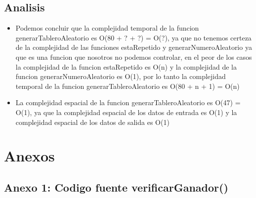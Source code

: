 \documentclass[10pt,twocolumn]{article}
\begin{document}
\subsection{Analisis}
\begin{itemize}
\item Podemos concluir que la complejidad temporal de la funcion generarTableroAleatorio es O(80 + ? + ?) = O(?), ya que no tenemos certeza de la complejidad de las funciones estaRepetido y generarNumeroAleatorio ya que es una funcion que nosotros no podemos controlar, en el peor de los casos la complejidad de la funcion estaRepetido es O(n) y la complejidad de la funcion generarNumeroAleatorio es O(1), por lo tanto la complejidad temporal de la funcion generarTableroAleatorio es O(80 + n + 1) = O(n)
\item La complejidad espacial de la funcion generarTableroAleatorio es O(47) = O(1), ya que la complejidad espacial de los datos de entrada es O(1) y la complejidad espacial de los datos de salida es O(1)
\end{itemize}











\newpage







\onecolumn

\section{Anexos}

\subsection{Anexo 1: Codigo fuente verificarGanador()}
\end{document}
